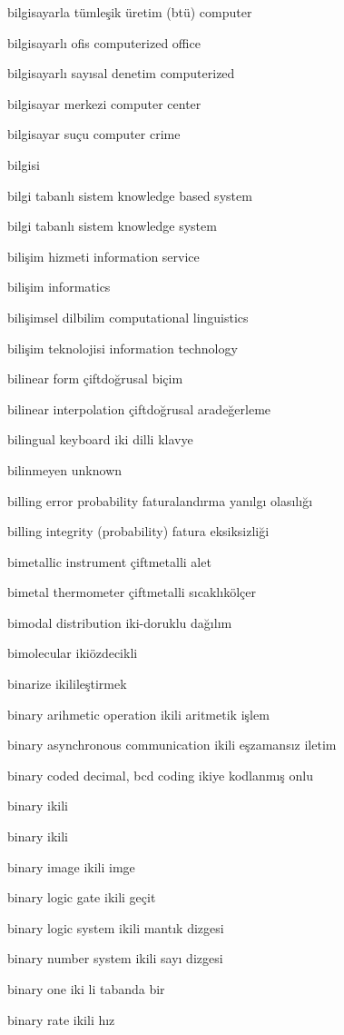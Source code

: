 \documentclass[12pt,fleqn]{article}\usepackage{../../common}
\begin{document}
bilgisayarla tümleşik üretim (btü) computer

bilgisayarlı ofis computerized office

bilgisayarlı sayısal denetim computerized

bilgisayar merkezi computer center

bilgisayar suçu computer crime

bilgisi

bilgi tabanlı sistem knowledge based system

bilgi tabanlı sistem knowledge system

bilişim hizmeti information service

bilişim informatics

bilişimsel dilbilim computational linguistics

bilişim teknolojisi information technology

bilinear form çiftdoğrusal biçim

bilinear interpolation çiftdoğrusal aradeğerleme

bilingual keyboard iki dilli klavye

bilinmeyen unknown

billing error probability faturalandırma yanılgı olasılığı

billing integrity (probability) fatura eksiksizliği

bimetallic instrument çiftmetalli alet

bimetal thermometer çiftmetalli sıcaklıkölçer

bimodal distribution iki-doruklu dağılım

bimolecular ikiözdecikli

binarize ikilileştirmek

binary arihmetic operation ikili aritmetik işlem

binary asynchronous communication ikili eşzamansız iletim

binary coded decimal, bcd coding ikiye kodlanmış onlu

binary ikili

binary ikili

binary image ikili imge

binary logic gate ikili geçit

binary logic system ikili mantık dizgesi

binary number system ikili sayı dizgesi

binary one iki li tabanda bir

binary rate ikili hız
\end{document}
